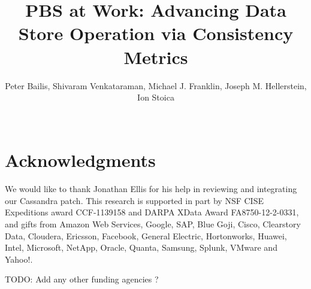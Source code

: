 \documentclass{sig-alternate}
\begin{document}
\title{PBS at Work: Advancing Data Store Operation via Consistency Metrics}

\author{Peter Bailis, Shivaram Venkataraman, Michael J. Franklin, Joseph M. Hellerstein, Ion Stoica\\
\\
}


\maketitle








\balance


\section{Acknowledgments}
We would like to thank Jonathan Ellis for his help in reviewing and integrating
our Cassandra patch.  
This research is supported in part by NSF CISE Expeditions award CCF-1139158 and
DARPA XData Award FA8750-12-2-0331, and  gifts from Amazon Web Services, Google,
SAP,  Blue Goji, Cisco, Clearstory Data, Cloudera, Ericsson, Facebook, General
Electric, Hortonworks, Huawei, Intel, Microsoft, NetApp, Oracle, Quanta,
Samsung, Splunk, VMware and Yahoo!.

TODO: Add any other funding agencies ?



\end{document}
